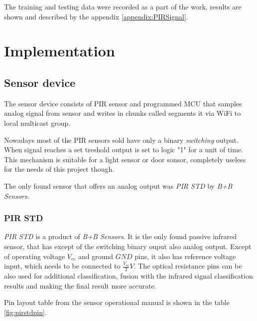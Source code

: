 The training and testing data were recorded as a part of the work, results are
shown and described by the appendix \ref{appendix:PIRSignal}.




\chapter{Implementation}

\section{Sensor device}

The sensor device consists of PIR sensor and programmed MCU that samples analog signal from
sensor and writes in chunks called segments it via WiFi to local multicast group.

Nowadays most of the PIR sensors sold have only a binary {\it switching} output.
When signal reaches a set treshold output is set to logic "1" for a unit of time.
This mechanism is suitable for a light sensor or door sonsor, completely useless
for the needs of this project though.

The only found sensor that offers an analog output was {\it PIR STD} by
{\it B+B Sensors}.

\subsection*{PIR STD}
{\it PIR STD} is a product of {\it B+B Sensors}. It is the only found passive infrared
sensor, that has except of the switching binary ouput also analog output. Except of
operating voltage $V_{cc}$ and ground $GND$ pins, it also has reference voltage input,
which needs to be connected to $\frac{V_{cc}}{2} V$. The optical resistance pins can
be also used for additional classification, fusion with the infrared signal classification
results and making the final result more accurate.

Pin layout table from the sensor operational manual is shown in the table \ref{fig:pirstdpin}.

